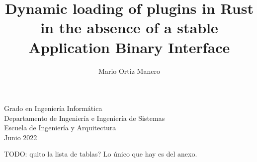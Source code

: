 \documentclass[a4paper,12pt,twoside,hidelinks,openright]{book}
\begin{document}
\begin{titlepage}
\begin{center}
\end{center}

\setcounter{footnote}{1}

\vspace*{2cm}
\fontsize{14pt}{14pt}\selectfont
\begin{center}
Grado en Ingeniería Informática\\ \medskip
Departamento de Ingeniería e Ingeniería de Sistemas\\
Escuela de Ingeniería y Arquitectura\\ \bigskip
Junio 2022\\
\end{center}


\renewcommand{\thefootnote}{\arabic{footnote}}
\end{titlepage}
\newpage


\title{Dynamic loading of plugins in Rust in the absence of a stable Application Binary Interface}
\author{Mario Ortiz Manero}

\pagebreak
\cleardoublepage%
\baselineskip 19pt

\renewcommand{\labelitemi}{$-$}
\renewcommand{\tablename}{Tabla}

\renewcommand{\appendixname}{Anexos}
\renewcommand{\appendixtocname}{Anexos}
\renewcommand{\appendixpagename}{Anexos}



\begingroup
\setlength{\parskip}{\baselineskip}%
\setlength{\parindent}{0pt}%

\newpage
\cleardoublepage%


\newpage
\cleardoublepage%


\newpage
\cleardoublepage%

\endgroup

\newpage
\cleardoublepage%
\renewcommand{\contentsname}{Índice}
\tableofcontents

\newpage
\renewcommand\listfigurename{Lista de Figuras}
\listoffigures

\newpage
\renewcommand\listtablename{Lista de Tablas}
\listoftables

TODO: quito la lista de tablas? Lo único que hay es del anexo.


\begingroup
\setlength{\parskip}{\baselineskip}%
\setlength{\parindent}{0pt}%
\end{document}
